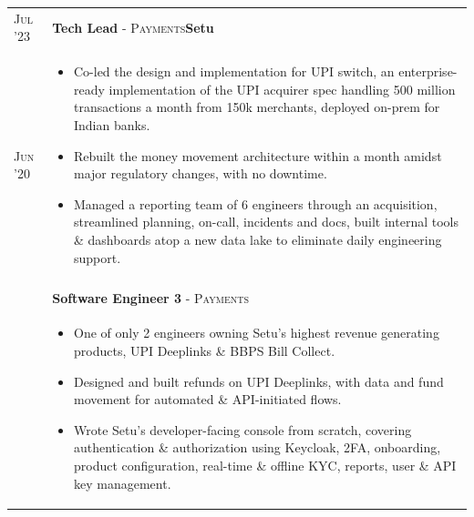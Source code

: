 \documentclass[a4paper,10pt]{extarticle} %
\begin{document}
\begin{tabularx}{\linewidth}{l | X}
\textsc{Jul '23} & \textbf{Tech Lead} \textsc{- Payments}\hfill\raisebox{-.2\height}{ \hspace{0.3em}}\textbf{Setu}\\
\textsc{Jun '20} & \begin{itemize}[leftmargin=*, nosep, before=\vspace{-1.0\baselineskip}, after=\vspace{-1.3\baselineskip}]
  \item Co-led the design and implementation for UPI switch, an enterprise-ready implementation of the UPI acquirer spec handling 500 million transactions a month from 150k merchants, deployed on-prem for Indian banks.
  \item Rebuilt the money movement architecture within a month amidst major regulatory changes, with no downtime.
  \item Managed a reporting team of 6 engineers through an acquisition, streamlined planning, on-call, incidents and docs, built internal tools \& dashboards atop a new data lake to eliminate daily engineering support.
\end{itemize}\\\\
& \textbf{Software Engineer 3} \textsc{- Payments}\\
& \begin{itemize}[leftmargin=*, nosep, before=\vspace{-1.0\baselineskip}, after=\vspace{-1.0\baselineskip}]
  \item One of only 2 engineers owning Setu's highest revenue generating products, UPI Deeplinks \& BBPS Bill Collect.
  \item Designed and built refunds on UPI Deeplinks, with data and fund movement for automated \& API-initiated flows.
  \item Wrote Setu's developer-facing console from scratch, covering authentication \& authorization using Keycloak, 2FA, onboarding, product configuration, real-time \& offline KYC, reports, user \& API key management.

\end{itemize}
\end{tabularx}
\end{document}
